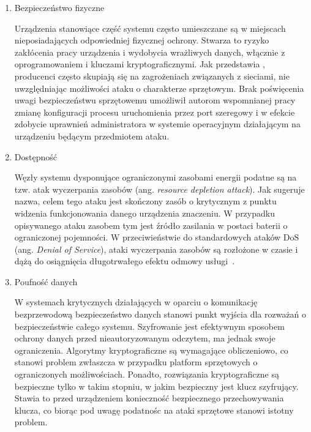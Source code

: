 		\begin{enumerate}[label=\Alph*.]
			\item Bezpieczeństwo fizyczne

				Urządzenia stanowiące część systemu często umieszczane są w miejscach nieposiadających odpowiedniej fizycznej ochrony. Stwarza to ryzyko zakłócenia pracy urządzenia i wydobycia wrażliwych danych, włącznie z oprogramowaniem i kluczami kryptograficznymi. Jak przedstawia \cite{iot-hardware-attack}, producenci często skupiają się na zagrożeniach związanych z sieciami, nie uwzględniając możliwości ataku o charakterze sprzętowym. Brak poświęcenia uwagi bezpieczeństwu sprzętowemu umożliwił autorom wspomnianej pracy zmianę konfiguracji procesu uruchomienia przez port szeregowy i w efekcie zdobycie uprawnień administratora w systemie operacyjnym działającym na urządzeniu będącym przedmiotem ataku.

			\item Dostępność

				Węzły systemu dysponujące ograniczonymi zasobami energii podatne są na tzw. atak wyczerpania zasobów (ang. \textit{resource depletion attack}). Jak sugeruje nazwa, celem tego ataku jest skończony zasób o krytycznym z punktu widzenia funkcjonowania danego urządzenia znaczeniu. W przypadku opisywanego ataku zasobem tym jest źródło zasilania w postaci baterii o ograniczonej pojemności. W przeciwieństwie do standardowych ataków DoS (ang. \textit{Denial of Service}), ataki wyczerpania zasobów są rozłożone w czasie i dążą do osiągnięcia długotrwałego efektu odmowy usługi~\cite{iot-rd-attack}.

			\item Poufność danych

				W systemach krytycznych działających w oparciu o komunikację bezprzewodową bezpieczeństwo danych stanowi punkt wyjścia dla rozważań o bezpieczeństwie całego systemu. Szyfrowanie jest efektywnym sposobem ochrony danych przed nieautoryzowanym odczytem, ma jednak swoje ograniczenia. Algorytmy kryptograficzne są wymagające obliczeniowo, co stanowi problem zwłaszcza w przypadku platform sprzętowych o ograniczonych możliwościach. Ponadto, rozwiązania kryptograficzne są bezpieczne tylko w takim stopniu, w jakim bezpieczny jest klucz szyfrujący. Stawia to przed urządzeniem konieczność bezpiecznego przechowywania klucza, co biorąc pod uwagę podatnośc na ataki sprzętowe stanowi istotny problem.

		\end{enumerate}

